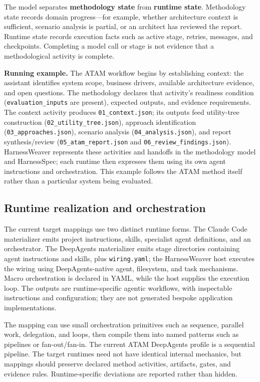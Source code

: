 \documentclass[10pt,conference]{IEEEtran}
\begin{document}
The model separates \textbf{methodology state} from \textbf{runtime state}. Methodology state records domain progress---for example, whether architecture context is sufficient, scenario analysis is partial, or an architect has reviewed the report. Runtime state records execution facts such as active stage, retries, messages, and checkpoints. Completing a model call or stage is not evidence that a methodological activity is complete.

\textbf{Running example.} The ATAM workflow begins by establishing context: the assistant identifies system scope, business drivers, available architecture evidence, and open questions. The methodology declares that activity's readiness condition (\texttt{evaluation\_inputs} are present), expected outputs, and evidence requirements. The context activity produces \texttt{01\_context.json}; its outputs feed utility-tree construction (\texttt{02\_utility\_tree.json}), approach identification (\texttt{03\_approaches.json}), scenario analysis (\texttt{04\_analysis.json}), and report synthesis/review (\texttt{05\_atam\_report.json} and \texttt{06\_review\_findings.json}). HarnessWeaver represents these activities and handoffs in the methodology model and HarnessSpec; each runtime then expresses them using its own agent instructions and orchestration. This example follows the ATAM method itself rather than a particular system being evaluated.

\subsection{Runtime realization and orchestration}

The current target mappings use two distinct runtime forms. The Claude Code materializer emits project instructions, skills, specialist agent definitions, and an orchestrator. The DeepAgents materializer emits stage directories containing agent instructions and skills, plus \texttt{wiring.yaml}; the HarnessWeaver host executes the wiring using DeepAgents-native agent, filesystem, and task mechanisms. Macro orchestration is declared in YAML, while the host supplies the execution loop. The outputs are runtime-specific agentic workflows, with inspectable instructions and configuration; they are not generated bespoke application implementations.

The mapping can use small orchestration primitives such as sequence, parallel work, delegation, and loops, then compile them into named patterns such as pipelines or fan-out/fan-in. The current ATAM DeepAgents profile is a sequential pipeline. The target runtimes need not have identical internal mechanics, but mappings should preserve declared method activities, artifacts, gates, and evidence rules. Runtime-specific deviations are reported rather than hidden.
\end{document}
